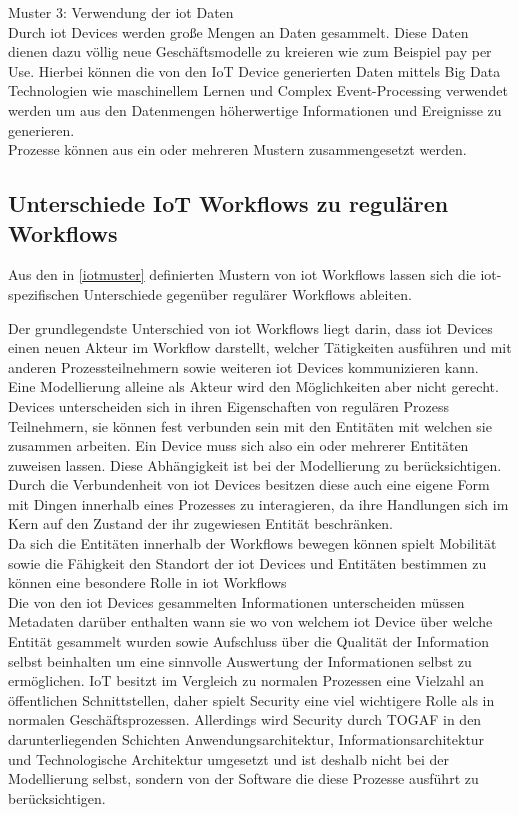 \documentclass[a4paper, 12pt, twoside, headsepline=true]{scrartcl} %
\begin{document}
Muster 3: Verwendung der \ac{iot} Daten \\ 
Durch \ac{iot} Devices werden große Mengen an Daten gesammelt. Diese Daten dienen dazu völlig neue Geschäftsmodelle zu kreieren wie zum Beispiel pay per Use. Hierbei können die von den IoT Device generierten Daten mittels Big Data Technologien wie maschinellem Lernen und Complex Event-Processing verwendet werden um aus den Datenmengen höherwertige Informationen und Ereignisse zu generieren.\\

Prozesse können aus ein oder mehreren Mustern zusammengesetzt werden.  

\subsection{Unterschiede IoT Workflows zu regulären Workflows}
Aus den in \ref{iotmuster} definierten Mustern von \ac{iot} Workflows lassen sich die \ac{iot}-spezifischen Unterschiede gegenüber regulärer Workflows ableiten. 

Der grundlegendste Unterschied von \ac{iot} Workflows liegt darin, dass \ac{iot} Devices einen neuen Akteur im Workflow darstellt, welcher Tätigkeiten ausführen und mit anderen Prozessteilnehmern sowie weiteren \ac{iot} Devices kommunizieren kann. \\
Eine Modellierung alleine als Akteur wird den Möglichkeiten aber nicht gerecht. Devices unterscheiden sich in ihren Eigenschaften von regulären Prozess Teilnehmern, sie können fest verbunden sein mit den Entitäten mit welchen sie zusammen arbeiten. Ein Device muss sich also ein oder mehrerer Entitäten zuweisen lassen. Diese Abhängigkeit ist bei der Modellierung zu berücksichtigen. \\
Durch die Verbundenheit von \ac{iot} Devices besitzen diese auch eine eigene Form mit Dingen innerhalb eines Prozesses zu interagieren, da ihre Handlungen sich im Kern auf den Zustand der ihr zugewiesen Entität beschränken.\\
Da sich die Entitäten innerhalb der Workflows bewegen können spielt Mobilität sowie die Fähigkeit den Standort der \ac{iot} Devices und Entitäten bestimmen zu können eine besondere Rolle in \ac{iot} Workflows\\
Die von den \ac{iot} Devices gesammelten Informationen unterscheiden müssen Metadaten darüber enthalten wann sie wo von welchem \ac{iot} Device über welche Entität gesammelt wurden sowie Aufschluss über die Qualität der Information selbst beinhalten um eine sinnvolle Auswertung der Informationen selbst zu ermöglichen.
IoT besitzt im Vergleich zu normalen Prozessen eine Vielzahl an öffentlichen Schnittstellen, daher spielt Security eine viel wichtigere Rolle als in normalen Geschäftsprozessen. Allerdings wird Security durch TOGAF  in den darunterliegenden Schichten Anwendungsarchitektur, Informationsarchitektur und Technologische Architektur umgesetzt \cite{enterpricearichitecture} und ist deshalb nicht bei der Modellierung selbst, sondern von der Software die diese Prozesse ausführt zu berücksichtigen.
\end{document}
